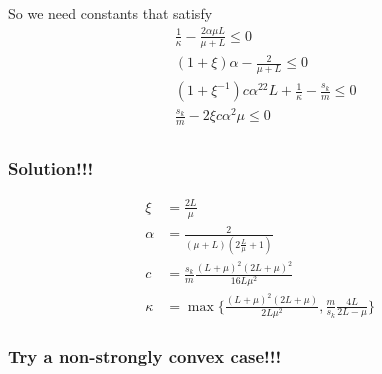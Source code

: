 \documentclass[12pt]{article}
\begin{document}
		
				So we need constants that satisfy 
				\begin{align*}
					&\frac{1}{\kappa} -\frac{2 \alpha \mu L}{\mu+L} \leq 0\\
						&(1+\xi) \alpha - \frac{2 }{\mu+L} \leq 0\\
						&(1+\xi^{-1})c \alpha^22L+\frac{1}{\kappa}- \frac{s_k}{m}  \leq 0\\
					& \frac{s_k}{m}- 2 \xi c \alpha^2 \mu\leq 0\\
					\end{align*}
					
					\subsubsection{Solution!!!}
					
					\begin{align*}
						\xi &= \frac{2L}{\mu} \\
						\alpha &= \frac{2}{(\mu +L)(2\frac{L}{\mu}+1)}\\
						c &= \frac{s_k}{m}\frac{(L+\mu)^2(2L+\mu)^2}{16 L \mu^2} \\
						\kappa &= \max \{ \frac{(L+\mu)^2(2L+\mu)}{2L\mu^2}  ,  \frac{m}{s_k}\frac{4L}{2L-\mu} \}
					\end{align*}
					
					\subsubsection{Try a non-strongly convex case!!!}
					
\end{document}

